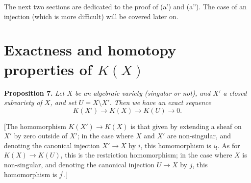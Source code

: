 \documentclass{article}
\newenvironment{itenv}[1]
  {\phantomsection\par\medskip\noindent\textbf{#1.}\itshape}
  {\par\medskip}
\begin{document}
The next two sections are dedicated to the proof of (a') and (a'').
The case of an injection (which is more difficult) will be covered later on.


\section{Exactness and homotopy properties of \texorpdfstring{$K(X)$}{K(X)}}
\label{section8}

\begin{itenv}{Proposition 7}
\label{proposition7}
  Let $X$ be an algebraic variety (singular or not), and $X'$ a closed subvariety of $X$, and set $U=X\setminus X'$.
  Then we have an exact sequence
  \[
    K(X') \to K(X) \to K(U) \to 0.
  \]
\end{itenv}

[The homomorphism $K(X')\to K(X)$ is that given by extending a sheaf on $X'$ by zero outside of $X'$;
in the case where $X$ and $X'$ are non-singular, and denoting the canonical injection $X'\to X$ by $i$, this homomorphism is $i_!$.
As for $K(X)\to K(U)$, this is the restriction homomorphism;
in the case where $X$ is non-singular, and denoting the canonical injection $U\to X$ by $j$, this homomorphism is $j^!$.]
\end{document}

